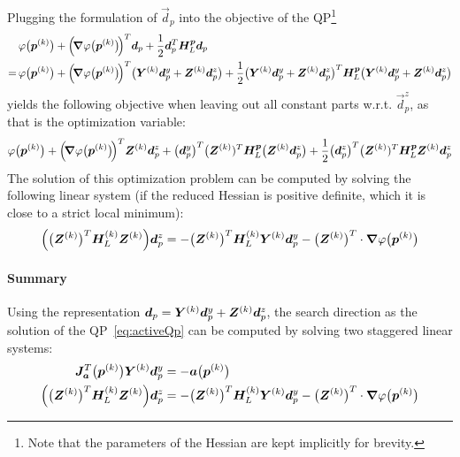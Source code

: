 				Plugging the formulation of \( \vec{d}_p \) into the objective of the QP\footnote{Note that the parameters of the Hessian are kept implicitly for brevity.}
				\begin{align*}
					&\, \varphi\big(\bm{p}^{(k)}\big) + \Big(\!\grad{\varphi}\big(\bm{p}^{(k)}\big)\!\Big)^T \bm{d}_p + \frac{1}{2} \bm{d}_p^T \bm{H}_L^{\bm{p}} \bm{d}_p \\
					=&\, \varphi\big(\bm{p}^{(k)}\big) + \Big(\!\grad{\varphi}\big(\bm{p}^{(k)}\big)\!\Big)^T \big( \bm{Y}^{(k)} \bm{d}_p^y + \bm{Z}^{(k)} \bm{d}_p^z \big) + \frac{1}{2} \big( \bm{Y}^{(k)} \bm{d}_p^y + \bm{Z}^{(k)} \bm{d}_p^z \big)^T \bm{H}_L^{\bm{p}} \big( \bm{Y}^{(k)} \bm{d}_p^y + \bm{Z}^{(k)} \bm{d}_p^z \big)
				\end{align*}
				yields the following objective when leaving out all constant parts w.r.t. \( \vec{d}_p^z \), as that is the optimization variable:
				\begin{align*}
					\varphi\big(\bm{p}^{(k)}\big) + \Big(\!\grad{\varphi}\big(\bm{p}^{(k)}\big)\!\Big)^T \bm{Z}^{(k)} \bm{d}_p^z + \big(\bm{d}_p^y\big)^T \big(\bm{Z}^{(k)})^T \bm{H}_L^{\bm{p}} \big( \bm{Z}^{(k)} \bm{d}_p^z \big) + \frac{1}{2} \big(\bm{d}_p^z\big)^T \big(\bm{Z}^{(k)})^T \bm{H}_L^{\bm{p}} \bm{Z}^{(k)} \bm{d}_p^z
				\end{align*}
				The solution of this optimization problem can be computed by solving the following linear system (if the reduced Hessian is positive definite, which it is close to a strict local minimum):
				\begin{align*}
					\Big( \big(\bm{Z}^{(k)}\big)^T \bm{H}_L^{(k)} \bm{Z}^{(k)} \Big) \bm{d}_p^z = -\big(\bm{Z}^{(k)}\big)^T \bm{H}_L^{(k)} \bm{Y}^{(k)} \bm{d}_p^y - \big(\bm{Z}^{(k)}\big)^T \cdot \grad{\varphi}\big(\bm{p}^{(k)}\big)
				\end{align*}

				\paragraph{Summary}
					Using the representation \( \bm{d}_p = \bm{Y}^{(k)} \bm{d}_p^y + \bm{Z}^{(k)} \bm{d}_p^z \), the search direction as the solution of the QP~\eqref{eq:activeQp} can be computed by solving two staggered linear systems:
					\begin{align*}
						\bm{J}_{\bm{a}}^T\big(\bm{p}^{(k)}\big) \bm{Y}^{(k)} \bm{d}_p^y &= -\bm{a}\big(\bm{p}^{(k)}\big) \\
						\Big( \big(\bm{Z}^{(k)}\big)^T \bm{H}_L^{(k)} \bm{Z}^{(k)} \Big) \bm{d}_p^z &= -\big(\bm{Z}^{(k)}\big)^T \bm{H}_L^{(k)} \bm{Y}^{(k)} \bm{d}_p^y - \big(\bm{Z}^{(k)}\big)^T \cdot \grad{\varphi}\big(\bm{p}^{(k)}\big)
					\end{align*}

